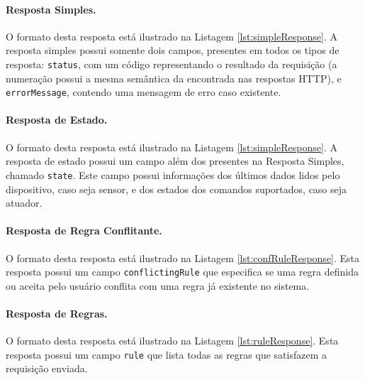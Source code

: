 \paragraph*{Resposta Simples.} O formato desta resposta está ilustrado na Listagem \ref{lst:simpleResponse}. A resposta simples possui somente dois campos, presentes em todos os tipos de resposta: \texttt{status}, com um código representando o resultado da requisição (a numeração possui a mesma semântica da encontrada nas respostas HTTP), e \texttt{errorMessage}, contendo uma mensagem de erro caso existente.

\noindent
\begin{minipage}[l]{\linewidth}

\end{minipage}

\paragraph*{Resposta de Estado.} O formato desta resposta está ilustrado na Listagem \ref{lst:simpleResponse}. A resposta de estado possui um campo além dos presentes na Resposta Simples, chamado \texttt{state}. Este campo possui informações dos últimos dados lidos pelo dispositivo, caso seja sensor, e dos estados dos comandos suportados, caso seja atuador.

\noindent
\begin{minipage}[l]{\linewidth}

\end{minipage}

\paragraph*{Resposta de Regra Conflitante.} O formato desta resposta está ilustrado na Listagem \ref{lst:confRuleResponse}. Esta resposta possui um campo \texttt{conflictingRule} que especifica se uma regra definida ou aceita pelo usuário conflita com uma regra já existente no sistema.

\noindent
\begin{minipage}[l]{\linewidth}

\end{minipage}

\paragraph*{Resposta de Regras.} O formato desta resposta está ilustrado na Listagem \ref{lst:ruleResponse}. Esta resposta possui um campo \texttt{rule} que lista todas as regras que satisfazem a requisição enviada.

